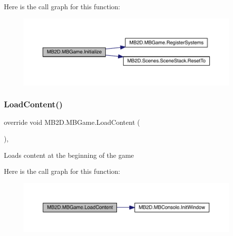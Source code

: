Here is the call graph for this function\+:
\nopagebreak
\begin{figure}[H]
\begin{center}
\leavevmode
\includegraphics[width=350pt]{class_m_b2_d_1_1_m_b_game_a2157be479c1831c49301cd472cc01cde_cgraph}
\end{center}
\end{figure}
\hypertarget{class_m_b2_d_1_1_m_b_game_a64ee7de17491790b25b326a644789082}{}\label{class_m_b2_d_1_1_m_b_game_a64ee7de17491790b25b326a644789082} 
\subsubsection{\texorpdfstring{Load\+Content()}{LoadContent()}}
{\footnotesize\ttfamily override void M\+B2\+D.\+M\+B\+Game.\+Load\+Content (\begin{DoxyParamCaption}{ }\end{DoxyParamCaption})\hspace{0.3cm}{\ttfamily [inline]}, {\ttfamily [protected]}}



Loads content at the beginning of the game 

Here is the call graph for this function\+:
\nopagebreak
\begin{figure}[H]
\begin{center}
\leavevmode
\includegraphics[width=350pt]{class_m_b2_d_1_1_m_b_game_a64ee7de17491790b25b326a644789082_cgraph}
\end{center}
\end{figure}
\hypertarget{class_m_b2_d_1_1_m_b_game_ad7e9a60dbaefe1416db0456b07b13487}{}\label{class_m_b2_d_1_1_m_b_game_ad7e9a60dbaefe1416db0456b07b13487} 

